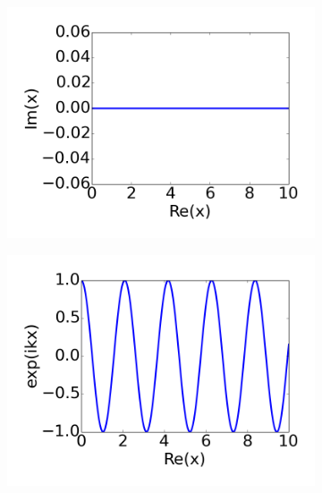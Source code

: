 \begin{figure}[tb]
	\begin{subfigure}{0.45\textwidth}
		\includegraphics[width=\textwidth]{images/pml/real-x.png}
		\caption{}
	\end{subfigure}
	\begin{subfigure}{0.45\textwidth}
		\includegraphics[width=\textwidth]{images/pml/real-x-wave.png}
		\caption{}
	\end{subfigure}



\end{figure}
